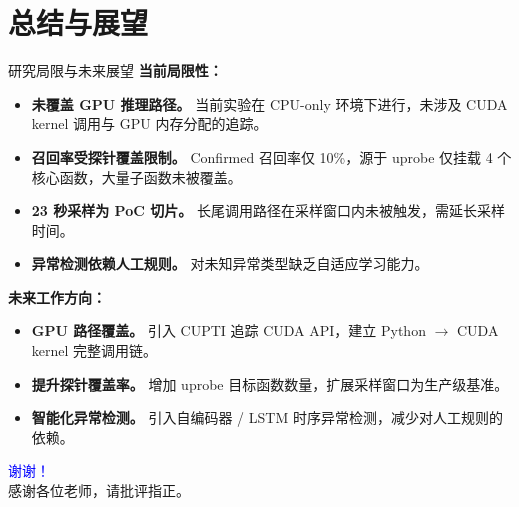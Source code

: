 \documentclass[aspectratio=169, 10pt]{beamer}
\begin{document}
\section{总结与展望}
\begin{frame}{研究局限与未来展望}
    \textbf{当前局限性：}

    \begin{itemize}
        \item \textbf{未覆盖 GPU 推理路径。} 当前实验在 CPU-only 环境下进行，未涉及 CUDA kernel 调用与 GPU 内存分配的追踪。
        \item \textbf{召回率受探针覆盖限制。} Confirmed 召回率仅 10\%，源于 uprobe 仅挂载 4 个核心函数，大量子函数未被覆盖。
        \item \textbf{23 秒采样为 PoC 切片。} 长尾调用路径在采样窗口内未被触发，需延长采样时间。
        \item \textbf{异常检测依赖人工规则。} 对未知异常类型缺乏自适应学习能力。
    \end{itemize}

    \vspace{0.5em}
    \textbf{未来工作方向：}

    \begin{itemize}
        \item \textbf{GPU 路径覆盖。} 引入 CUPTI 追踪 CUDA API，建立 Python $\to$ CUDA kernel 完整调用链。
        \item \textbf{提升探针覆盖率。} 增加 uprobe 目标函数数量，扩展采样窗口为生产级基准。
        \item \textbf{智能化异常检测。} 引入自编码器 / LSTM 时序异常检测，减少对人工规则的依赖。
    \end{itemize}
\end{frame}

\begin{frame}
    \centering
    \Huge \textcolor{blue}{谢谢！} \\
    \vspace{20pt}
    \large 感谢各位老师，请批评指正。
\end{frame}
\end{document}
